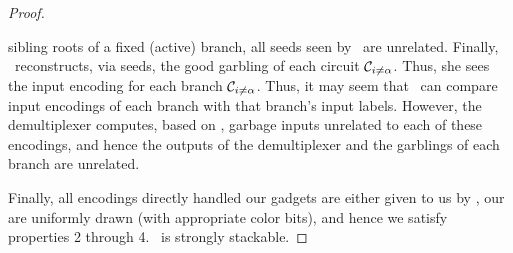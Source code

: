 \begin{proof}
\begin{itemize}
      sibling roots of a fixed (active) branch, all seeds seen by \E\ are
      unrelated.
      Finally, \E\ reconstructs, via seeds, the good garbling of each
      circuit $\mathcal C_{i\neq\alpha}$. Thus, she sees the input encoding
      for each branch $\mathcal C_{i\neq\alpha}$.
      Thus, it may seem that \E\ can compare input encodings of
      each branch with that branch's input labels.
      However, the demultiplexer computes, based on \aid, garbage inputs
      unrelated to each of these encodings, and hence the outputs of
      the demultiplexer and the garblings of each branch are
      unrelated.
  \end{itemize}
  Finally,
  all encodings directly handled our gadgets are either given to us by
  \underscheme, our are uniformly drawn (with appropriate color bits), and
  hence we satisfy properties 2 through 4.
  \ourschemelong\ is strongly stackable.
\end{proof}

